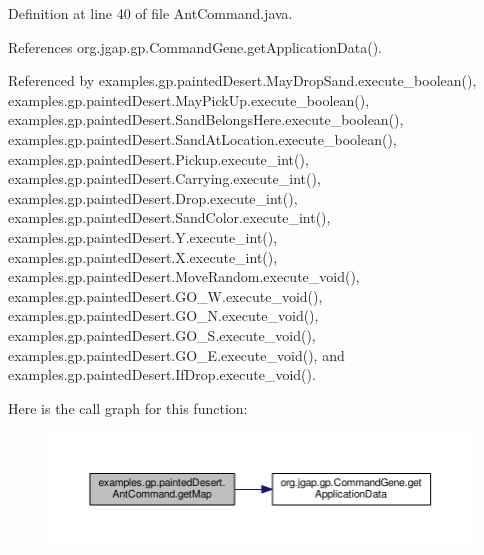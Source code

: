 Definition at line 40 of file Ant\-Command.\-java.



References org.\-jgap.\-gp.\-Command\-Gene.\-get\-Application\-Data().



Referenced by examples.\-gp.\-painted\-Desert.\-May\-Drop\-Sand.\-execute\-\_\-boolean(), examples.\-gp.\-painted\-Desert.\-May\-Pick\-Up.\-execute\-\_\-boolean(), examples.\-gp.\-painted\-Desert.\-Sand\-Belongs\-Here.\-execute\-\_\-boolean(), examples.\-gp.\-painted\-Desert.\-Sand\-At\-Location.\-execute\-\_\-boolean(), examples.\-gp.\-painted\-Desert.\-Pickup.\-execute\-\_\-int(), examples.\-gp.\-painted\-Desert.\-Carrying.\-execute\-\_\-int(), examples.\-gp.\-painted\-Desert.\-Drop.\-execute\-\_\-int(), examples.\-gp.\-painted\-Desert.\-Sand\-Color.\-execute\-\_\-int(), examples.\-gp.\-painted\-Desert.\-Y.\-execute\-\_\-int(), examples.\-gp.\-painted\-Desert.\-X.\-execute\-\_\-int(), examples.\-gp.\-painted\-Desert.\-Move\-Random.\-execute\-\_\-void(), examples.\-gp.\-painted\-Desert.\-G\-O\-\_\-\-W.\-execute\-\_\-void(), examples.\-gp.\-painted\-Desert.\-G\-O\-\_\-\-N.\-execute\-\_\-void(), examples.\-gp.\-painted\-Desert.\-G\-O\-\_\-\-S.\-execute\-\_\-void(), examples.\-gp.\-painted\-Desert.\-G\-O\-\_\-\-E.\-execute\-\_\-void(), and examples.\-gp.\-painted\-Desert.\-If\-Drop.\-execute\-\_\-void().



Here is the call graph for this function\-:
\nopagebreak
\begin{figure}[H]
\begin{center}
\leavevmode
\includegraphics[width=350pt]{classexamples_1_1gp_1_1painted_desert_1_1_ant_command_a667f3c05fddc4993282a33ca3ed0ab25_cgraph}
\end{center}
\end{figure}




